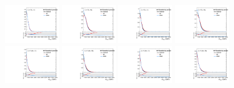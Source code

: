 \begin{figure}[htbp]
  \centering
  \includegraphics[width=0.21\textwidth]{fig/uncertainties/systs_res_e_LP_bb_LDy_MVVScaleBinW_ProjX.pdf}
  \includegraphics[width=0.21\textwidth]{fig/uncertainties/systs_res_e_LP_bb_HDy_MVVScaleBinW_ProjX.pdf}
  \includegraphics[width=0.21\textwidth]{fig/uncertainties/systs_res_e_LP_bb_LDy_MVVScaleBinTop_ProjX.pdf}
  \includegraphics[width=0.21\textwidth]{fig/uncertainties/systs_res_e_LP_bb_HDy_MVVScaleBinTop_ProjX.pdf}\\
  \includegraphics[width=0.21\textwidth]{fig/uncertainties/systs_res_e_LP_nobb_LDy_MVVScaleBinW_ProjX.pdf}
  \includegraphics[width=0.21\textwidth]{fig/uncertainties/systs_res_e_LP_nobb_HDy_MVVScaleBinW_ProjX.pdf}
  \includegraphics[width=0.21\textwidth]{fig/uncertainties/systs_res_e_LP_nobb_LDy_MVVScaleBinTop_ProjX.pdf}
  \includegraphics[width=0.21\textwidth]{fig/uncertainties/systs_res_e_LP_nobb_HDy_MVVScaleBinTop_ProjX.pdf}\\

\end{figure}
